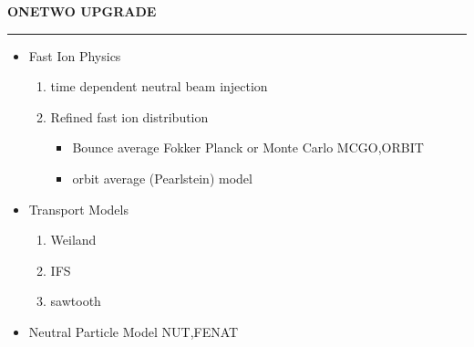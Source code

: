 \documentclass{slides}
\begin{document}
      \begin{slide}
       \begin{center}
           \Large\bfseries ONETWO UPGRADE

        \end{center}
        \normalsize  

        \bigskip
        \hrule height4pt
          \bf
         \begin{itemize}
           \item Fast Ion Physics
	      \begin{enumerate}
	         \item time dependent neutral beam injection
	         \item Refined fast ion distribution
	            \begin{itemize}
                       \item Bounce average Fokker Planck or
	                     Monte Carlo \color {red} MCGO,ORBIT 
                             \color{blue}
                        \item orbit average (Pearlstein) model
                    \end{itemize}
	      \end{enumerate}
	    \item Transport Models
		  \begin{enumerate}
	             \item Weiland
	             \item IFS
	             \item sawtooth
	          \end{enumerate}
            \item Neutral Particle Model \color{red} NUT,FENAT 
                  \color {blue}
        \end{itemize}
        \end{slide}
\end{document}
